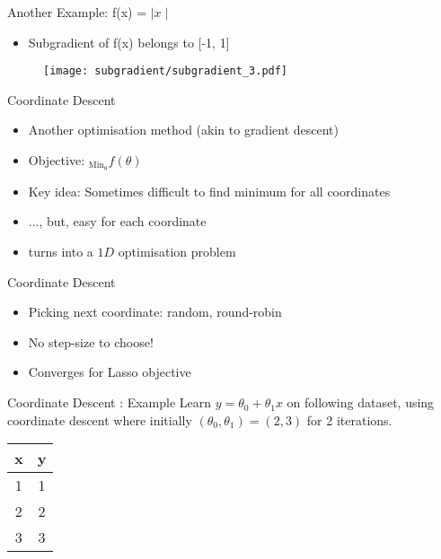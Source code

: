 \documentclass{beamer}
\begin{document}
\begin{frame}{Another Example: f(x) = $\mid x \mid$}

\begin{itemize}
\item Subgradient of f(x) belongs to [-1, 1]
\end{itemize}
\begin{figure}
\centering
\texttt{[image: subgradient/subgradient\_3.pdf]}
\label{fig:my_label}
\end{figure}
\end{frame}

\begin{frame}{Coordinate Descent}
\begin{itemize}[<+->]
	\item Another optimisation method (akin to gradient descent)
	\item Objective: $_{\operatorname{Min_\theta}}f(\theta)$
	\item Key idea: Sometimes difficult to find minimum for all coordinates
	\item ..., but, easy for each coordinate
	\item turns into a $1D$ optimisation problem
\end{itemize}
\end{frame}

{

}


\begin{frame}{Coordinate Descent}
\begin{itemize}[<+->]
\item Picking next coordinate: \pause random, round-robin
\item No step-size to choose!
\item Converges for Lasso objective
\end{itemize}
\end{frame}




\begin{frame}{Coordinate Descent : Example}
Learn $y = \theta_0 + \theta_1 x$ on following dataset, using coordinate descent where initially $(\theta_0, \theta_1) = (2,3)$  for 2 iterations. 
\begin{table}[]
\centering
\label{tab:my-table}
\begin{tabular}{|c|c|}
\hline
\textbf{x} & \textbf{y} \\ \hline
1 & 1 \\ \hline
2 & 2 \\ \hline
3 & 3 \\ \hline
\end{tabular}
\end{table}
\end{frame}
\end{document}
